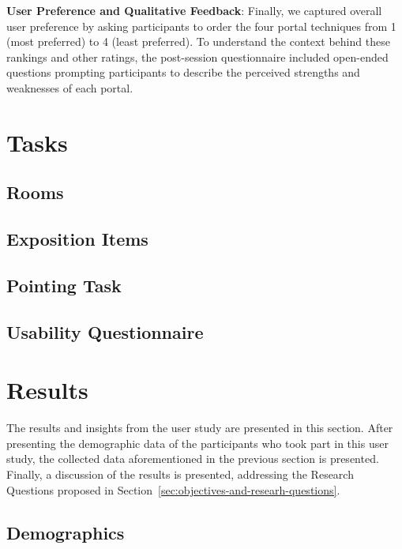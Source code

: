 \textbf{User Preference and Qualitative Feedback}: Finally, we captured overall user preference by asking participants to order the four portal techniques from 1 (most preferred) to 4 (least preferred). To understand the context behind these rankings and other ratings, the post-session questionnaire included open-ended questions prompting participants to describe the perceived strengths and weaknesses of each portal.

\section{Tasks}
\label{sec:tasks}

\subsection{Rooms}
\label{sec:rooms}

\subsection{Exposition Items}
\label{sec:expo-items}

\subsection{Pointing Task}
\label{sec:pointing-task}

\subsection{Usability Questionnaire}
\label{sec:questionnaire}


\section{Results}
\label{sec:results}

The results and insights from the user study are presented in this section. After presenting the demographic data of the participants who 
took part in this user study, the collected data aforementioned in the previous section is presented. Finally, a discussion of the 
results is presented, addressing the Research Questions proposed in Section~\ref{sec:objectives-and-researh-questions}.

\subsection{Demographics}
\label{sec:demographics}

